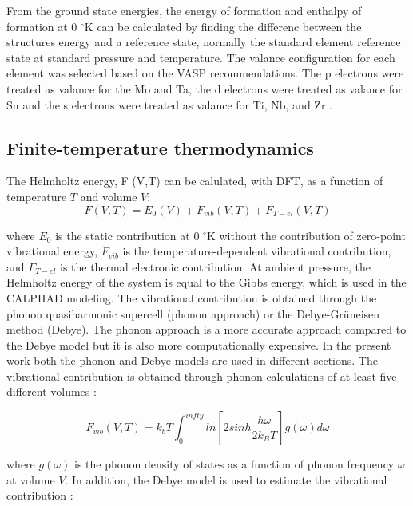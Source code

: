 From the ground state energies, the energy of formation and enthalpy of formation at 0 $^\circ$K can be calculated by finding the differenc between the structures energy and a reference state, normally the standard element reference state at standard pressure and temperature. The valance configuration for each element was selected based on the VASP recommendations. The p electrons were treated as valance for the Mo and Ta, the d electrons were treated as valance for Sn and the s electrons were treated as valance for Ti, Nb, and Zr \cite{Kresse1996,Kresse1999}. 

\subsection{Finite-temperature thermodynamics}

The Helmholtz energy, F (V,T) can be calulated, with DFT, as a function of temperature $T$ and volume $V$:
 \begin{equation}
 \label{eq: helmholtz}
 F(V,T) = E_{0}(V) + F_{vib}(V,T) + F_{T-el}(V,T)
 \end{equation}
 
 \noindent where $E_0$ is the static contribution at 0 $^\circ$K without the contribution of zero-point vibrational energy, $F_{vib}$ is the temperature-dependent vibrational contribution, and $F_{T-el}$ is the thermal electronic contribution. At ambient pressure, the Helmholtz energy of the system is equal to the Gibbs energy, which is used in the CALPHAD modeling. The vibrational contribution is obtained through the phonon quasiharmonic supercell (phonon approach) or the Debye-Grüneisen method (Debye). The phonon approach is a more accurate approach compared to the Debye model but it is also more computationally expensive. In the present work both the phonon and Debye models are used in different sections. The vibrational contribution is obtained through phonon calculations of at least five different volumes \cite{Wang2012}: 

\begin{equation}
\label{eq: phonon}
F_{vib}(V,T) = k_{b}T \int_{0}^{infty} ln[2sinh\frac{\hbar \omega}{2k_BT}] g(\omega) d\omega
\end{equation}

\noindent where $g(\omega)$ is the phonon density of states as a function of phonon frequency $\omega$ at volume $V$.  In addition, the Debye model is used to estimate the vibrational contribution \cite{Shang2010}: 

